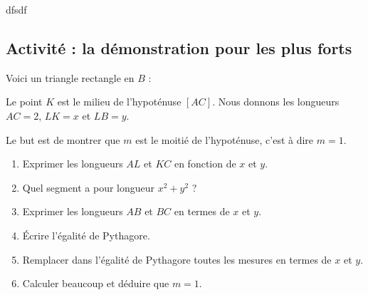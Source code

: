 
dfsdf

\subsection*{Activité : la démonstration pour les plus forts}

Voici un triangle rectangle en \( B\) :

\begin{center}

\end{center}
Le point \( K\) est le milieu de l'hypoténuse \( [AC]\). Nous donnons les longueurs \( AC=2\), \( LK=x\) et \( LB=y\).

Le but est de montrer que \( m\) est le moitié de l'hypoténuse, c'est à dire \( m=1\).

\begin{enumerate}
    \item
        Exprimer les longueurs \( AL\) et \( KC\) en fonction de \( x\) et \( y\).
    \item
        Quel segment a pour longueur \( x^2+y^2\) ?
    \item
        Exprimer les longueurs \( AB\) et \( BC\) en termes de \( x\) et \( y\).
    \item
        Écrire l'égalité de Pythagore.
    \item
        Remplacer dans l'égalité de Pythagore toutes les mesures en termes de \( x\) et \( y\).
    \item
        Calculer beaucoup et déduire que \( m=1\).
\end{enumerate}

